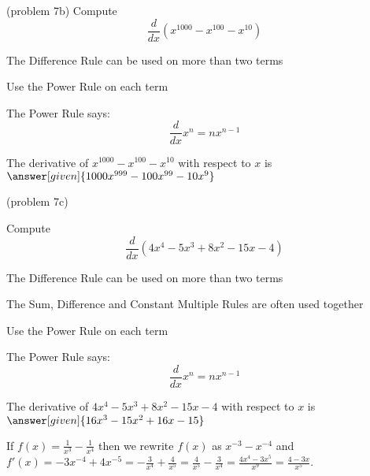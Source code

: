 \documentclass{ximera}
\begin{document}
\begin{problem}(problem 7b)
  Compute 
  \[
  \frac{d}{dx} \left(x^{1000} - x^{100} - x^{10}\right)
  \]
  
    \begin{hint}
		  The Difference Rule can be used on more than two terms
		\end{hint}
		\begin{hint}
      Use the Power Rule on each term
    \end{hint}
    \begin{hint}
      The Power Rule says:
      \[
      \frac{d}{dx} x^n = nx^{n-1}
      \]
    \end{hint}    
		The derivative of $x^{1000} - x^{100} - x^{10}$ with respect to $x$ is
		 $\answer[given]{1000x^{999} - 100x^{99} - 10x^9}$
	
\end{problem}(problem 7c)


\begin{problem} %
  Compute 
  \[
  \frac{d}{dx} \left(4x^4 - 5x^3 + 8x^2 - 15x - 4\right)
  \]
  
    \begin{hint}
		  The Difference Rule can be used on more than two terms
		\end{hint}
		\begin{hint}
		  The Sum, Difference and Constant Multiple Rules are often used together 
		\end{hint}
		\begin{hint}
      Use the Power Rule on each term
    \end{hint}
    \begin{hint}
      The Power Rule says:
      \[
      \frac{d}{dx} x^n = nx^{n-1}
      \]
    \end{hint}    
		The derivative of $4x^4 - 5x^3 + 8x^2 - 15x - 4$ with respect to $x$ is
		 $\answer[given]{16x^3 - 15x^2 + 16x - 15}$
	
\end{problem}


\begin{example}[example 8]
 If $f(x) = \frac{1}{x^3} - \frac{1}{x^4}$ then we rewrite $f(x)$ as $x^{-3} - x^{-4}$ and 
$f'(x) = -3x^{-4} + 4x^{-5} = -\frac{3}{x^4} + \frac{4}{x^5} = \frac{4}{x^5}-\frac{3}{x^4} = 
\frac{4x^4 - 3x^5}{x^9} = \frac{4 - 3x}{x^5}$.
\end{example}
\end{document}
